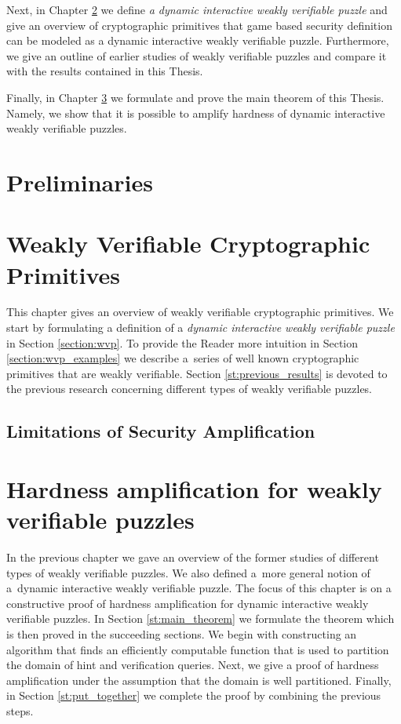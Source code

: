 \documentclass[11pt,a4paper,titlepage]{memoir}
\begin{document}
Next, in Chapter \ref{ch:intro_weakly} we define \textit{a dynamic interactive weakly verifiable puzzle} and
give an overview of cryptographic primitives that game based security definition can be modeled as
a dynamic interactive weakly verifiable puzzle. Furthermore, we give an outline of earlier studies
of weakly verifiable puzzles and compare it with the results contained in this Thesis.

Finally, in Chapter \ref{ch:main_result} we formulate and prove the main theorem of this Thesis.
Namely, we show that it is possible to amplify hardness of dynamic interactive weakly verifiable puzzles.
%
\chapter{Preliminaries}
\label{ch:preliminaries}


\chapter{Weakly Verifiable Cryptographic Primitives}
\label{ch:intro_weakly}
This chapter gives an overview of weakly verifiable cryptographic primitives.
We start by formulating a definition of a \textit{dynamic interactive weakly verifiable puzzle} in Section \ref{section:wvp}.
To provide the Reader more intuition in Section \ref{section:wvp_examples} we describe a~series of well known cryptographic primitives
that are weakly verifiable. Section \ref{st:previous_results} is devoted to the previous research concerning different types of weakly verifiable puzzles.
%



%
\section{Limitations of Security Amplification}
%
\chapter{Hardness amplification for weakly verifiable puzzles}
\label{ch:main_result}
In the previous chapter we gave an overview of the former studies of different types of weakly verifiable puzzles.
We also defined a~more general notion of a~dynamic interactive weakly verifiable puzzle.
The focus of this chapter is on a constructive proof of hardness amplification for dynamic interactive weakly verifiable puzzles.
In Section \ref{st:main_theorem} we formulate the theorem which is then proved in the succeeding sections.
We begin with constructing an algorithm that finds an efficiently computable function that is used
to partition the domain of hint and verification queries. Next, we give a proof of hardness amplification
under the assumption that the domain is well partitioned. Finally, in Section \ref{st:put_together}
we complete the proof by combining the previous steps.
%

%

%

%

%
\end{document}

